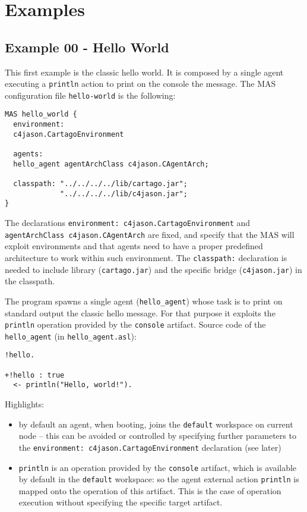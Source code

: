 \documentclass[11pt]{report}
\newcommand\code[1]{{\small{\mbox{\texttt{{#1}}}}}}
\newcommand{\jason}{\mbox{\sf{\emph{{Jason}}}}}
\newcommand{\cartago}{\mbox{\sf{CArtAgO}}}
\begin{document}
\chapter{Examples}

\section{Example 00 - Hello World}

This first example is the classic hello world.  It is composed by a single agent executing a \code{println} action to print on the console the message.
%
The {\jason} MAS configuration file \texttt{hello-world} is the following:
%
{\small{
\begin{verbatim}
MAS hello_world {
  environment: 
  c4jason.CartagoEnvironment
    
  agents:  
  hello_agent agentArchClass c4jason.CAgentArch;

  classpath: "../../../../lib/cartago.jar";
             "../../../../lib/c4jason.jar";    
}
\end{verbatim}}}
%
\noindent The declarations \code{environment: c4jason.CartagoEnvironment} and  \code{agentArchClass c4jason.CAgentArch} are fixed, and specify that the MAS will exploit {\cartago} environments and that agents need to have a proper predefined architecture to work within such environment.
%
The \code{classpath:} declaration is needed to include {\cartago} library (\code{cartago.jar}) and the specific {\jason} bridge (\code{c4jason.jar}) in the classpath.

\medskip

\noindent The program spawns a single agent (\code{hello\_agent}) whose task is to print on standard output the classic hello message.
%
For that purpose it exploits the \code{println} operation provided by the \code{console} artifact.
%
Source code of the \code{hello\_agent} (in \code{hello\_agent.asl}):
%
{\small{
\begin{verbatim}
!hello.

+!hello : true
  <- println("Hello, world!").
\end{verbatim}}}
%
\noindent  Highlights:
%
\begin{itemize}
\item by default an agent, when booting, joins the \code{default} workspace on current node -- this can be avoided or controlled by specifying further parameters to the \code{environment: c4jason.CartagoEnvironment}  declaration (see later)
\item \code{println} is an operation provided by the \code{console} artifact, which is available by default in the \code{default} workspace: 
%
so the agent external action \code{println} is mapped onto the operation of this artifact.
%
This is the case of operation execution without specifying the specific target artifact.
%
\end{itemize}
\end{document}

